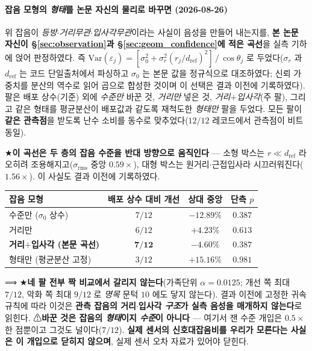 \documentclass[11pt]{report}
\numberwithin{equation}{chapter}
\numberwithin{figure}{chapter}
\numberwithin{table}{chapter}
\begin{document}
\paragraph{잡음 모형의 \emph{형태}를 논문 자신의 물리로 바꾸면 (2026-08-26)}
\label{sec:realnoise}
위 잡음이 \emph{등방$\cdot$거리무관$\cdot$입사각무관}이라는 사실이 음성을 만들어 내는지를,
\textbf{본 논문 자신이 \S\ref{sec:observation}과 \S\ref{sec:geom_confidence}에 적은 곡선}을
실측 기하에 얹어 판정하였다. 즉 $\mathrm{Var}(\varepsilon_j) = [\sigma_0^2 +
\sigma_r^2 (r_j/d_{\mathrm{ref}})^2]\,/\,\cos\theta_j$ 로 두었다($\sigma_r$ 과
$d_{\mathrm{ref}}$ 는 코드 단일출처에서 파싱하고 $\sigma_0$ 는 본문 값을 정규식으로
대조하였다; 신뢰 가중치를 분산의 역수로 읽어 곱으로 합성한 것이며 이 선택은 결과 이전에
기록하였다). 팔은 배포 상수(기준) 외에 \emph{수준만} 바꾼 것, \emph{거리만} 넣은 것,
\emph{거리$+$입사각}(주 팔), 그리고 같은 형태를 평균분산이 배포값과 같도록 재척도한
\emph{형태만} 팔을 두었다. 모든 팔이 \textbf{같은 관측점}을 받도록 난수 소비를 동수로
맞추었다($12/12$ 레코드에서 관측점이 비트 동일).

★\textbf{이 곡선은 두 층의 잡음 수준을 반대 방향으로 움직인다} --- 소형 박스는
$r \ll d_{\mathrm{ref}}$ 라 오히려 조용해지고($\sigma_{\mathrm{rms}}$ 중앙 $0.59\times$),
대형 박스는 원거리$\cdot$근접입사라 시끄러워진다($1.56\times$). 이 사실도 결과 이전에
기록하였다.

\begin{center}
\begin{tabular}{lccc}
\toprule
잡음 모형 & 배포 상수 대비 개선 & 상대 중앙 & 단측 $p$ \\
\midrule
수준만 ($\sigma_0$ 상수) & $7/12$ & $-12.89\%$ & $0.387$ \\
거리만 & $6/12$ & $+4.23\%$ & $0.613$ \\
\textbf{거리$+$입사각 (본문 곡선)} & $\mathbf{7/12}$ & $-4.60\%$ & $0.387$ \\
형태만 (평균분산 고정) & $3/12$ & $+15.16\%$ & $0.981$ \\
\bottomrule
\end{tabular}
\end{center}

⟹ ★\textbf{네 팔 전부 짝 비교에서 갈리지 않는다}(가족단위 $\alpha = 0.0125$; 개선 쪽
최대 $7/12$, 악화 쪽 최대 $9/12$ 로 \emph{명목} 문턱 $10$ 에도 닿지 않는다). 결과 이전에
고정한 귀속 규칙에 따라 이것은 \textbf{관측 잡음의 거리$\cdot$입사각 \emph{구조}가 실측
음성을 매개하지 않는다}로 읽힌다. ⚠\textbf{바꾼 것은 잡음의 \emph{형태}이지 \emph{수준}이
아니다} --- 여기서 잰 수준 개입은 $0.5\times$ 한 점뿐이고 그것도 널이다($7/12$).
\textbf{실제 센서의 신호대잡음비를 우리가 모른다는 사실은 이 개입으로 닫히지 않으며},
실제 센서 오차 자료가 있어야 닫힌다.
\end{document}
